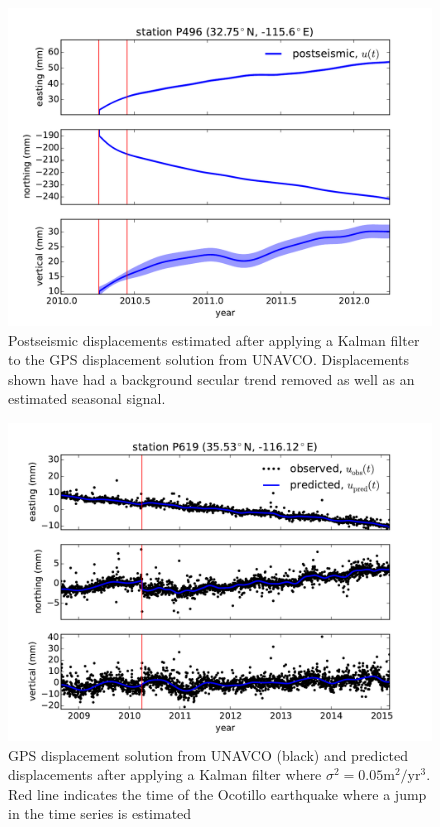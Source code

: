 \documentclass[12pt]{article}
\begin{document}
\begin{figure}
\includegraphics[scale=0.6]{Figures/figure_2}
\centering
\caption{Postseismic displacements estimated after applying a Kalman filter to the GPS displacement solution from UNAVCO.  Displacements shown have had a background secular trend removed as well as an estimated seasonal signal.} 
\label{fig:P496PS}
\end{figure}

\begin{figure}
\includegraphics[scale=0.6]{Figures/figure_3}
\centering
\caption{GPS displacement solution from UNAVCO (black) and predicted displacements after applying a Kalman filter where $\sigma^2=0.05 \mathrm{m}^2/\mathrm{yr}^3$. Red line indicates the time of the Ocotillo earthquake where a jump in the time series is estimated}
\label{fig:P619Fit}
\end{figure}
\end{document}
